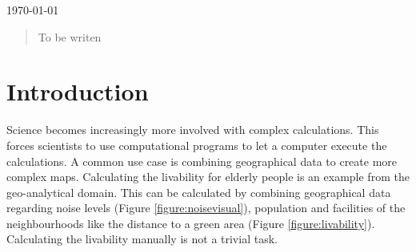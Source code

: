 \documentclass{article}
\begin{document}
\begin{titlepage}
	
	
	
	\vfill\vfill\vfill %
	
	{\large\today} %
	
	
	 
	
	\vfill %
	
\end{titlepage}

\begin{abstract}
    To be writen
\end{abstract}
\newpage
\tableofcontents

\newpage

\section{Introduction}
Science becomes increasingly more involved with complex calculations. This forces scientists to  use computational programs to let a computer execute the calculations. A common use case is combining geographical data to create more complex maps. Calculating the livability for elderly people \cite{scheider2009ontology} is an example from the geo-analytical domain. 
This can be calculated by combining geographical data regarding noise levels (Figure \ref{figure:noisevisual}), population and facilities of the neighbourhoods like the distance to a green area (Figure \ref{figure:livability}). Calculating the livability manually  is not a trivial task. 
\end{document}
